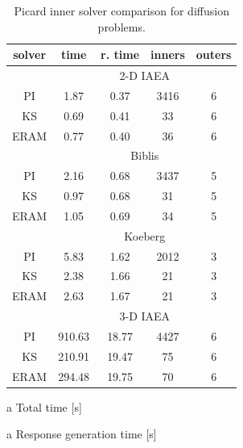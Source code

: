 \begin{table}[ht] 
 \begin{center} 
 
 \begin{threeparttable}

 
 \begin{tabular}{ccccc} 
 \toprule 
  solver & time \tnote{a} & r. time \tnote{b} & inners & outers \\
 \midrule 
              &  \multicolumn{4}{c}{2-D IAEA} \\ 
 \midrule 
           PI &      1.87 &      0.37 &         3416 &            6 \\ 
           KS &      0.69 &      0.41 &           33 &            6 \\ 
         ERAM &      0.77 &      0.40 &           36 &            6 \\ 
 \midrule 
              &  \multicolumn{4}{c}{Biblis} \\ 
 \midrule 
           PI &      2.16 &      0.68 &         3437 &            5 \\ 
           KS &      0.97 &      0.68 &           31 &            5 \\ 
         ERAM &      1.05 &      0.69 &           34 &            5 \\ 
 \midrule 
              &  \multicolumn{4}{c}{Koeberg} \\ 
 \midrule 
           PI &      5.83 &      1.62 &         2012 &            3 \\ 
           KS &      2.38 &      1.66 &           21 &            3 \\ 
         ERAM &      2.63 &      1.67 &           21 &            3 \\ 
 \midrule 
              &  \multicolumn{4}{c}{3-D IAEA} \\ 
 \midrule 
           PI &    910.63 &     18.77 &         4427 &            6 \\ 
           KS &    210.91 &     19.47 &           75 &            6 \\ 
         ERAM &    294.48 &     19.75 &           70 &            6 \\ 
 \bottomrule 
 \end{tabular} 
 

 {\footnotesize
 \begin{tablenotes}
   \item[a] Total time [s]
   \item[a] Response generation time [s]
 \end{tablenotes}
 }
 \end{threeparttable}
 
 
 
 \end{center} 
 \caption{Picard inner solver comparison for diffusion problems.} 
 \label{tbl:diffusion_picard_inner_study} 
\end{table} 


